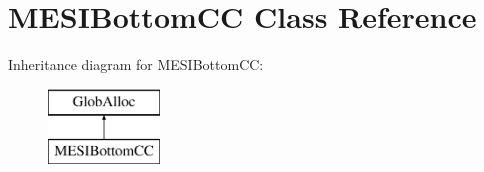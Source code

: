 \hypertarget{classMESIBottomCC}{\section{M\-E\-S\-I\-Bottom\-C\-C Class Reference}
\label{classMESIBottomCC}
}
Inheritance diagram for M\-E\-S\-I\-Bottom\-C\-C\-:\begin{figure}[H]
\begin{center}
\leavevmode
\includegraphics[height=2.000000cm]{classMESIBottomCC}
\end{center}
\end{figure}
